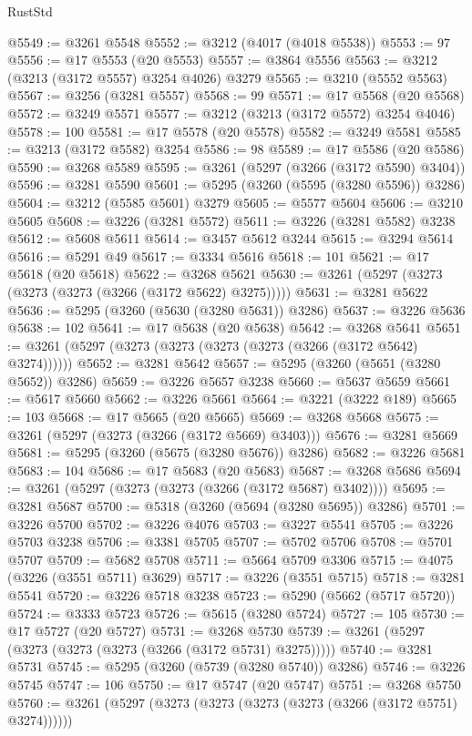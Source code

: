 \begin{lexlean}{RustStd}
\begin{coremodule}
@5549 := @3261 @5548
@5552 := @3212 (@4017 (@4018 @5538))
@5553 := 97
@5556 := @17 @5553 (@20 @5553)
@5557 := @3864 @5556
@5563 := @3212 (@3213 (@3172 @5557) @3254 @4026) @3279
@5565 := @3210 (@5552 @5563)
@5567 := @3256 (@3281 @5557)
@5568 := 99
@5571 := @17 @5568 (@20 @5568)
@5572 := @3249 @5571
@5577 := @3212 (@3213 (@3172 @5572) @3254 @4046)
@5578 := 100
@5581 := @17 @5578 (@20 @5578)
@5582 := @3249 @5581
@5585 := @3213 (@3172 @5582) @3254
@5586 := 98
@5589 := @17 @5586 (@20 @5586)
@5590 := @3268 @5589
@5595 := @3261 (@5297 (@3266 (@3172 @5590) @3404))
@5596 := @3281 @5590
@5601 := @5295 (@3260 (@5595 (@3280 @5596)) @3286)
@5604 := @3212 (@5585 @5601) @3279
@5605 := @5577 @5604
@5606 := @3210 @5605
@5608 := @3226 (@3281 @5572)
@5611 := @3226 (@3281 @5582) @3238
@5612 := @5608 @5611
@5614 := @3457 @5612 @3244
@5615 := @3294 @5614
@5616 := @5291 @49
@5617 := @3334 @5616
@5618 := 101
@5621 := @17 @5618 (@20 @5618)
@5622 := @3268 @5621
@5630 := @3261 (@5297 (@3273 (@3273 (@3273 (@3266 (@3172 @5622) @3275)))))
@5631 := @3281 @5622
@5636 := @5295 (@3260 (@5630 (@3280 @5631)) @3286)
@5637 := @3226 @5636
@5638 := 102
@5641 := @17 @5638 (@20 @5638)
@5642 := @3268 @5641
@5651 := @3261 (@5297 (@3273 (@3273 (@3273 (@3273 (@3266 (@3172 @5642) @3274))))))
@5652 := @3281 @5642
@5657 := @5295 (@3260 (@5651 (@3280 @5652)) @3286)
@5659 := @3226 @5657 @3238
@5660 := @5637 @5659
@5661 := @5617 @5660
@5662 := @3226 @5661
@5664 := @3221 (@3222 @189)
@5665 := 103
@5668 := @17 @5665 (@20 @5665)
@5669 := @3268 @5668
@5675 := @3261 (@5297 (@3273 (@3266 (@3172 @5669) @3403)))
@5676 := @3281 @5669
@5681 := @5295 (@3260 (@5675 (@3280 @5676)) @3286)
@5682 := @3226 @5681
@5683 := 104
@5686 := @17 @5683 (@20 @5683)
@5687 := @3268 @5686
@5694 := @3261 (@5297 (@3273 (@3273 (@3266 (@3172 @5687) @3402))))
@5695 := @3281 @5687
@5700 := @5318 (@3260 (@5694 (@3280 @5695)) @3286)
@5701 := @3226 @5700
@5702 := @3226 @4076
@5703 := @3227 @5541
@5705 := @3226 @5703 @3238
@5706 := @3381 @5705
@5707 := @5702 @5706
@5708 := @5701 @5707
@5709 := @5682 @5708
@5711 := @5664 @5709 @3306
@5715 := @4075 (@3226 (@3551 @5711) @3629)
@5717 := @3226 (@3551 @5715)
@5718 := @3281 @5541
@5720 := @3226 @5718 @3238
@5723 := @5290 (@5662 (@5717 @5720))
@5724 := @3333 @5723
@5726 := @5615 (@3280 @5724)
@5727 := 105
@5730 := @17 @5727 (@20 @5727)
@5731 := @3268 @5730
@5739 := @3261 (@5297 (@3273 (@3273 (@3273 (@3266 (@3172 @5731) @3275)))))
@5740 := @3281 @5731
@5745 := @5295 (@3260 (@5739 (@3280 @5740)) @3286)
@5746 := @3226 @5745
@5747 := 106
@5750 := @17 @5747 (@20 @5747)
@5751 := @3268 @5750
@5760 := @3261 (@5297 (@3273 (@3273 (@3273 (@3273 (@3266 (@3172 @5751) @3274))))))

\end{coremodule}
\end{lexlean}
